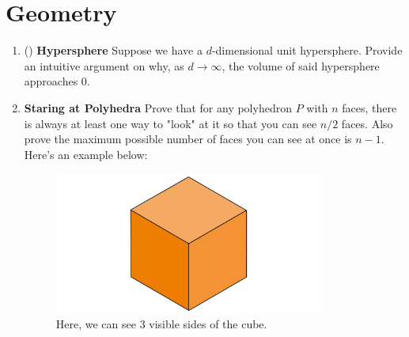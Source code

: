 \documentclass[11pt]{scrartcl}
\begin{document}
\section{Geometry}
\begin{enumerate}[label=\textbf{G\arabic*}.]
    \item (\fullchili) \textbf{Hypersphere} \newline
    Suppose we have a $d$-dimensional unit hypersphere. Provide an intuitive argument on why, as $d \to \infty$, the volume of said hypersphere approaches 0.

    \item \textbf{Staring at Polyhedra} \newline
    Prove that for any polyhedron $P$ with $n$ faces, there is always at least one way to "look" at it so that you can see $n/2$ faces. Also prove the maximum possible number of faces you can see at once is $n-1$. Here's an example below:

    \begin{figure}[h]
        \centering
        \includegraphics[width = 8.9cm]{Diagrams/Cube.png} %
        \caption{Here, we can see $3$ visible sides of the cube.}
        \label{fig:Cube}
    \end{figure}    
\end{enumerate}

\newpage
\end{document}
